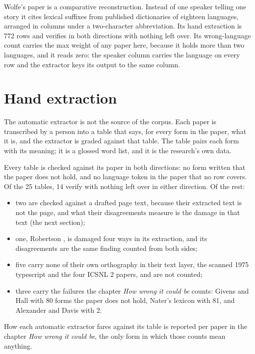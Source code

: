 Wolfe's paper \cite{src:Wolfe-2025} is a comparative reconstruction. Instead of one speaker telling one story it cites lexical suffixes from published dictionaries of eighteen languages, arranged in columns under a two-character abbreviation. Its hand extraction is 772 rows and verifies in both directions with nothing left over. Its wrong-language count carries the max weight of any paper here, because it holds more than two languages, and it reads zero: the speaker column carries the language on every row and the extractor keys its output to the same column.

\section{Hand extraction}

The automatic extractor is not the source of the corpus. Each paper is transcribed by a person into a table that says, for every form in the paper, what it is, and the extractor is graded against that table. The table pairs each form with its meaning; it is a glossed word list, and it is the research's own data.

Every table is checked against its paper in both directions: no form written that the paper does not hold, and no language token in the paper that no row covers. Of the 25 tables, 14 verify with nothing left over in either direction. Of the rest:

\begin{itemize}
\item two are checked against a drafted page text, because their extracted text is not the page, and what their disagreements measure is the damage in that text (the next section);
\item one, Robertson \cite{src:Robertson-2012}, is damaged four ways in its extraction, and its disagreements are the same finding counted from both sides;
\item five carry none of their own orthography in their text layer, the scanned 1975 typescript and the four ICSNL 2 papers, and are not counted;
\item three carry the failures the chapter \emph{How wrong it could be} counts: Givens and Hall \cite{src:Givens-and-Hall-2023} with 80 forms the paper does not hold, Nater's lexicon \cite{src:Nater-2013} with 81, and Alexander and Davis \cite{src:Alexander-and-Davis-2026} with 2.
\end{itemize}

How each automatic extractor fares against its table is reported per paper in the chapter \emph{How wrong it could be}, the only form in which those counts mean anything.

